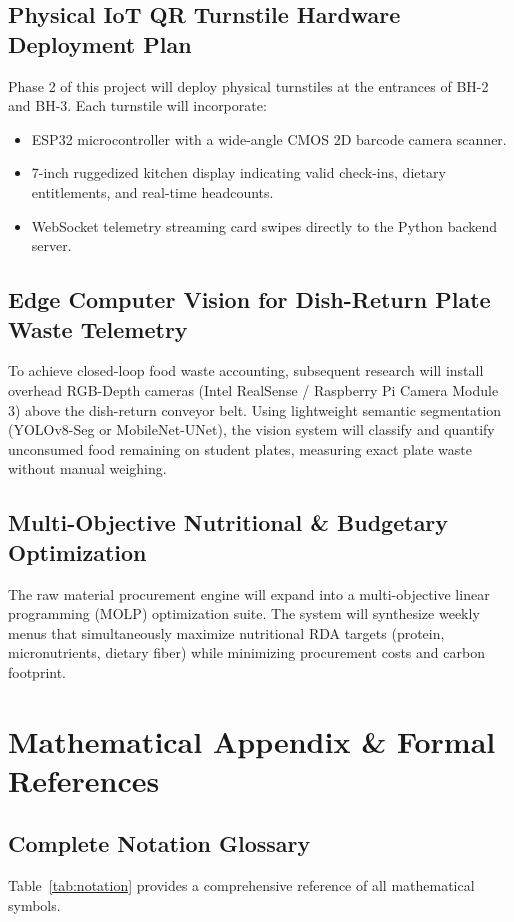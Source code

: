 \documentclass[11pt,a4paper,oneside]{report}
\begin{document}
\section{Physical IoT QR Turnstile Hardware Deployment Plan}
Phase 2 of this project will deploy physical turnstiles at the entrances of BH-2 and BH-3. Each turnstile will incorporate:
\begin{itemize}
  \item ESP32 microcontroller with a wide-angle CMOS 2D barcode camera scanner.
  \item 7-inch ruggedized kitchen display indicating valid check-ins, dietary entitlements, and real-time headcounts.
  \item WebSocket telemetry streaming card swipes directly to the Python backend server.
\end{itemize}

\section{Edge Computer Vision for Dish-Return Plate Waste Telemetry}
To achieve closed-loop food waste accounting, subsequent research will install overhead RGB-Depth cameras (Intel RealSense / Raspberry Pi Camera Module 3) above the dish-return conveyor belt. Using lightweight semantic segmentation (YOLOv8-Seg or MobileNet-UNet), the vision system will classify and quantify unconsumed food remaining on student plates, measuring exact plate waste without manual weighing.

\section{Multi-Objective Nutritional \& Budgetary Optimization}
The raw material procurement engine will expand into a multi-objective linear programming (MOLP) optimization suite. The system will synthesize weekly menus that simultaneously maximize nutritional RDA targets (protein, micronutrients, dietary fiber) while minimizing procurement costs and carbon footprint.


\chapter{Mathematical Appendix \& Formal References}

\section{Complete Notation Glossary}
Table~\ref{tab:notation} provides a comprehensive reference of all mathematical symbols.
\end{document}
